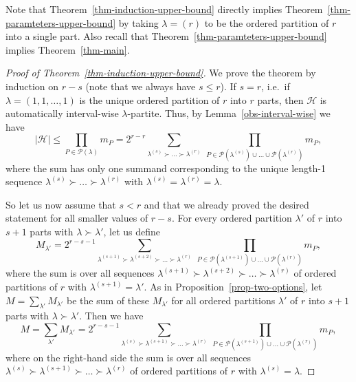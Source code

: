 \documentclass[11pt]{article}
\theoremstyle{definition}
\numberwithin{equation}{section}
\numberwithin{figure}{section}
\newcommand{\HH}{\mathcal{H}}
\newcommand{\PP}{\mathcal{P}}
\begin{document}
Note that Theorem~\ref{thm-induction-upper-bound} directly implies Theorem~\ref{thm-paramteters-upper-bound} by taking $\lambda=(r)$ to be the ordered partition of $r$ into a single part. Also recall that Theorem~\ref{thm-paramteters-upper-bound} implies Theorem~\ref{thm-main}.

\begin{proof}[Proof of Theorem~\ref{thm-induction-upper-bound}]
    We prove the theorem by induction on $r-s$ (note that we always have $s\le r$). If $s=r$, i.e.\ if $\lambda=(1,1,\dots,1)$ is the unique ordered partition of $r$ into $r$ parts, then $\HH$ is automatically interval-wise $\lambda$-partite. Thus, by Lemma~\ref{obs-interval-wise} we have
    \[|\HH|\le \prod_{P\in \PP(\lambda)} m_{P}=2^{r-r} \sum_{\lambda^{(s)} \succ \dots \succ \lambda^{(r)}}\  \prod_{P\in \PP(\lambda^{(s)})\cup\dots\cup \PP(\lambda^{(r)})} m_{P},\]
    where the sum has only one summand corresponding to the unique length-1 sequence $\lambda^{(s)} \succ \dots \succ \lambda^{(r)}$ with $\lambda^{(s)}=\lambda^{(r)}=\lambda$.

    So let us now assume that $s<r$ and that we already proved the desired statement for all smaller values of $r-s$.  For every ordered partition $\lambda'$ of $r$ into $s+1$ parts with $\lambda\succ\lambda'$, let us define
    \[M_{\lambda'}=2^{r-s-1} \sum_{\lambda^{(s+1)} \succ \lambda^{(s+2)} \succ \dots \succ \lambda^{(r)}}\ \prod_{P\in \PP(\lambda^{(s+1)})\cup\dots\cup \PP(\lambda^{(r)})} m_{P},\]
    where the sum is over all sequences $\lambda^{(s+1)} \succ \lambda^{(s+2)} \succ \dots \succ \lambda^{(r)}$ of ordered partitions of $r$ with $\lambda^{(s+1)}=\lambda'$. As in Proposition~\ref{prop-two-options}, let $M=\sum_{\lambda'}M_{\lambda'}$ be the sum of these $M_{\lambda'}$ for all ordered partitions $\lambda'$ of $r$ into $s+1$ parts with $\lambda\succ\lambda'$. Then we have
    \[M=\sum_{\lambda'} M_{\lambda'}=2^{r-s-1} \sum_{\lambda^{(s)}\succ \lambda^{(s+1)}\succ \dots \succ \lambda^{(r)}}\ \prod_{ P\in \PP(\lambda^{(s+1)})\cup\dots\cup \PP(\lambda^{(r)}) } m_{P},\]
    where on the right-hand side the sum is over all sequences $\lambda^{(s)} \succ \lambda^{(s+1)} \succ \dots \succ \lambda^{(r)}$ of ordered partitions of $r$ with $\lambda^{(s)}=\lambda$.


\end{proof}
\end{document}
